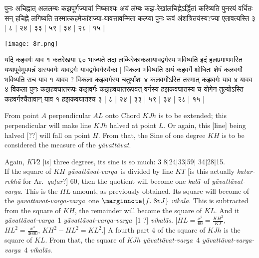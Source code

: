\documentclass[12pt]{book}
\let\*=\d
\def\kala{\textit{ka\-l\=a}}
\def\ya{\textit{y\=avat\-t\=avat}}
\def\yava{\textit{y\=avat\-t\=avat-varga}}
\def\yavava{\textit{y\=avat\-t\=avat-varga-varga}}
\def\vikala{\textit{vi\-ka\-l\=a}}
\def\vikalas{\textit{vi\-ka\-l\=as}}
\def\danda{$|$}
\begin{document}
\newpage

{\s पुनः अचिह्नात् अललम्बः कझपूर्णज्यायां निष्काश्यः अयं लंम्बः कझ-रेखांलचिह्नेऽर्द्धितां करिष्यति
पुनरयं वर्धितः सन् हचिह्ने लगिष्यति तस्मात्कहमेकांशज्या-यावत्तावन्मिता कल्प्या पुनः कवं अंशत्रितयंस्य?ज्या एतावत्यस्ति ३ | ८ | २४ | ३३ | ५९ | ३४ | २८ | १५ |} \\

\begin{center}
\texttt{[image: 8r.png]}
\end{center}

{\s यदि कहवर्गः याव १ कतरेखया ६० भाज्यते तदा लब्धिरेकाकलायावद्वर्गस्य भविष्यति इदं हलप्रमाणमस्ति यथापूर्वमुपपन्नं अस्यवर्गः यावद्वर्गः यावद्वर्गवर्गस्यैका $|$
विकला भविष्यति अयं कहवर्गे शोधितः शेषं कलवर्गो भविष्यति सच याव १ यावव ? विकला कझवर्गस्य चतुर्थांशः ४ 
कलवर्गोऽस्ति तस्मात् कझवर्गः याव ४ यावव ४ विकला पुनः कझहवघातरूपः
कझवर्गः कझहवघातरूपवत् वर्गस्य हझकवघातस्य च योगेन तुल्योऽस्ति
कहवर्गश्चैतावान् याव १ हझकवघातश्च ३ | ८ | २४ | ३३ | ५९ | ३४ | २८ | १५ |}

\newpage

From point $A$ perpendicular $AL$ onto Chord $KJh$ is to be extended; this perpendicular 
will make line $KJh$ halved at point $L$. Or again, this [line] being halved [??] will fall on point $H$.
From that, the Sine of one degree $KH$ is to be considered the measure of the \ya. 

Again, $KV2$ [is] three degrees, its sine is so much: 3 8\danda 24\danda 33\danda 59\danda
34\danda 28\danda 15. \\ 

\iffalse 
\begin{center}
\texttt{[image: 8r.png]}
\captionof{figure}{8r}
\end{center}
\fi 

If the square of $KH$ \yava\ is divided by line $KT$ [is this actually 
\textit{katar-rekh\=a} for Ar.\ \textit{qa\*tar}?] 60, then the quotient  will become
one \kala\ of \yava.   This is the $HL$-amount, as previously obtained. Its square
will become of the \yavava\ one
$\marginnote{f.~8v J}$
\vikala. This is subtracted from the square of $KH$, the remainder will become the
square of $KL$.  And it \yava\ 1  \yavava\ [1 ?] \vikalas. 
[$HL = \frac{x^2}{60} = \frac{KH^2}{KT}$, $HL^2 = \frac{x^4}{3600}$,
$KH^2 - HL^2 = KL^2$.]
A fourth part 4 of the square of $KJh$  is the square of $KL$. From that, 
the square of $KJh$ \yava\ 4 \yavava\ 4 \vikalas. 
\end{document}
